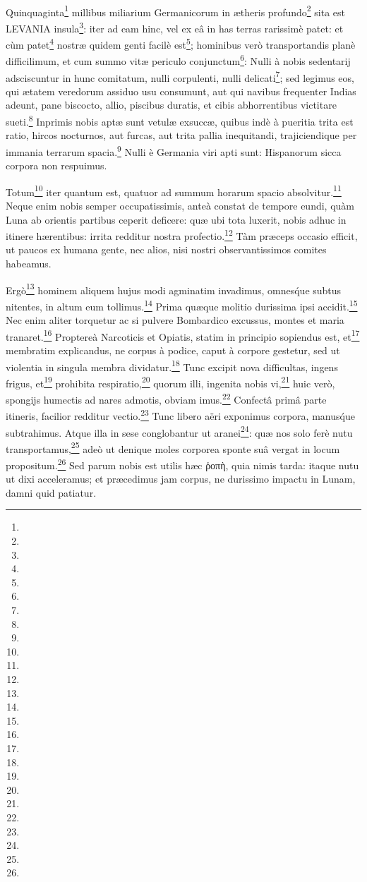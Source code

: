 \documentclass[a4paper, 11pt, oneside, polutonikogreek, german]{article}
\begin{document}
\paragraph{}
Quinquaginta\footnote{} millibus miliarium Germanicorum in ætheris profundo\footnote{} sita est LEVANIA insula\footnote{}: iter ad eam hinc, vel ex eâ in has terras rarissimè patet: et cùm patet\footnote{} nostræ quidem genti facilè est\footnote{}; hominibus verò transportandis planè difficilimum, et cum summo vitæ periculo conjunctum\footnote{}: Nulli à nobis sedentarij adsciscuntur in hunc comitatum, nulli corpulenti, nulli delicati\footnote{}; sed legimus eos, qui ætatem veredorum assiduo usu consumunt, aut qui navibus frequenter Indias adeunt, pane biscocto, allio, piscibus duratis, et cibis abhorrentibus victitare sueti.\footnote{} Inprimis nobis aptæ sunt vetulæ exsuccæ, quibus indè à pueritia trita est ratio, hircos nocturnos, aut furcas, aut trita pallia inequitandi, trajiciendique per immania terrarum spacia.\footnote{} Nulli è Germania viri apti sunt: Hispanorum sicca corpora non respuimus.

Totum\footnote{} iter quantum est, quatuor ad summum horarum spacio absolvitur.\footnote{} Neque enim nobis semper occupatissimis, anteà constat de tempore eundi, quàm Luna ab orientis partibus ceperit deficere: quæ ubi tota luxerit, nobis adhuc in itinere hærentibus: irrita redditur nostra profectio.\footnote{} Tàm præceps occasio efficit, ut paucos ex humana gente, nec alios, nisi nostri observantissimos comites habeamus.

Ergò\footnote{} hominem aliquem hujus modi agminatim invadimus, omnes\'que subtus nitentes, in altum eum tollimus.\footnote{} Prima quæque molitio durissima ipsi accidit.\footnote{} Nec enim aliter torquetur ac si pulvere Bombardico excussus, montes et maria tranaret.\footnote{} Proptereà Narcoticis et Opiatis, statim in principio sopiendus est, et\footnote{} membratim explicandus, ne corpus à podice, caput à corpore gestetur, sed ut violentia in singula membra dividatur.\footnote{} Tunc excipit nova difficultas, ingens frigus, et\footnote{} prohibita respiratio,\footnote{} quorum illi, ingenita nobis vi,\footnote{} huic verò, spongijs humectis ad nares admotis, obviam imus.\footnote{} Confectâ primâ parte itineris, facilior redditur vectio.\footnote{} Tunc libero aëri exponimus corpora, manus\'que subtrahimus. Atque illa in sese conglobantur ut aranei\footnote{}: quæ nos solo ferè nutu transportamus,\footnote{} adeò ut denique moles corporea sponte suâ vergat in locum propositum.\footnote{} Sed parum nobis est utilis hæc ῥοπὴ, quia nimis tarda: itaque nutu ut dixi acceleramus; et præcedimus jam corpus, ne durissimo impactu in Lunam, damni quid patiatur.
\end{document}
